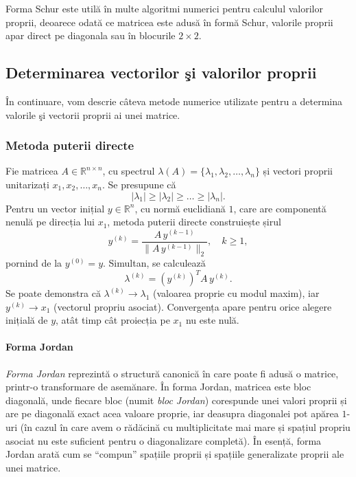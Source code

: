 \documentclass{exam}
\begin{document}
Forma Schur este utilă în multe algoritmi numerici pentru calculul valorilor proprii, deoarece odată ce matricea este adusă în formă Schur, valorile proprii apar direct pe diagonala sau în blocurile \(2\times 2\).

\subsection{Determinarea vectorilor şi valorilor proprii}

În continuare, vom descrie câteva metode numerice utilizate pentru a determina valorile şi vectorii proprii ai unei matrice.

\subsubsection{Metoda puterii directe}

Fie matricea $A \in \mathbb{R}^{n\times n}$, cu spectrul $\lambda(A) = \{\lambda_1,\lambda_2,\dots,\lambda_n\}$ și vectori proprii unitarizați $x_1,x_2,\dots,x_n$. Se presupune că
\[
	|\lambda_1| \ge |\lambda_2| \ge \dots \ge |\lambda_n|.
\]
Pentru un vector inițial $y \in \mathbb{R}^{n}$, cu normă euclidiană $1$, care are componentă nenulă pe direcția lui $x_1$, metoda puterii directe construiește șirul
\[
	y^{(k)} = \frac{A\,y^{(k-1)}}{\|A\,y^{(k-1)}\|_2}, \quad k \ge 1,
\]
pornind de la $y^{(0)} = y$. Simultan, se calculează
\[
	\lambda^{(k)} = (y^{(k)})^T A\,y^{(k)}.
\]
Se poate demonstra că $\lambda^{(k)}\to \lambda_1$ (valoarea proprie cu modul maxim), iar $y^{(k)}\to x_1$ (vectorul propriu asociat). Convergența apare pentru orice alegere inițială de $y$, atât timp cât proiecția pe $x_1$ nu este nulă.

\paragraph*{Forma Jordan}
\emph{Forma Jordan} reprezintă o structură canonică în care poate fi adusă o matrice, printr-o transformare de asemănare. În forma Jordan, matricea este bloc diagonală, unde fiecare bloc (numit \emph{bloc Jordan}) corespunde unei valori proprii și are pe diagonală exact acea valoare proprie, iar deasupra diagonalei pot apărea $1$-uri (în cazul în care avem o rădăcină cu multiplicitate mai mare și spațiul propriu asociat nu este suficient pentru o diagonalizare completă). În esență, forma Jordan arată cum se “compun” spațiile proprii și spațiile generalizate proprii ale unei matrice.
\end{document}

